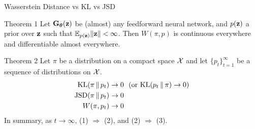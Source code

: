 \documentclass{beamer}
\begin{document}
\begin{frame}{Wasserstein Distance vs KL vs JSD}
	\begin{block}{Theorem 1}
		Let $\mathbf{G}_{\boldsymbol{\theta}}(\mathbf{z})$ be (almost) any feedforward neural network, and $p(\mathbf{z})$ a prior over $\mathbf{z}$ such that $\mathbb{E}_{p(\mathbf{z})} \|\mathbf{z}\| < \infty$. Then $W(\pi, p)$ is continuous everywhere and differentiable almost everywhere.
	\end{block}
	\eqpause
	\begin{block}{Theorem 2}
		Let $\pi$ be a distribution on a compact space $\mathcal{X}$ and let $\{p_t\}_{t=1}^\infty$ be a sequence of distributions on $\mathcal{X}$. 
		\begin{align}
			\mathrm{KL}(\pi\,\|\,p_t) &\rightarrow 0 \ \ (\text{or }\mathrm{KL} (p_t\,\|\,\pi) \rightarrow 0) \\
			\mathrm{JSD}(\pi\,\|\,p_t) &\rightarrow 0 \\
			W(\pi, p_t) &\rightarrow 0
		\end{align}
		In summary, as $t \rightarrow \infty$, (1) $\Rightarrow$ (2), and (2) $\Rightarrow$ (3).
	\end{block}
\end{frame}
\end{document}
